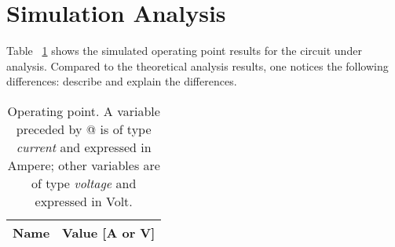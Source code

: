 \section{Simulation Analysis}
\label{sec:simulation}


Table ~\ref{tab:op} shows the simulated operating point results for the circuit
under analysis. Compared to the theoretical analysis results, one notices the
following differences: describe and explain the differences.



\begin{table}[h]
	\centering
	\begin{tabular}{|l|r|}
		\hline    
		{\bf Name} & {\bf Value [A or V]} \\ \hline
    		
	\end{tabular}
	
	\caption{Operating point. A variable preceded by @ is of type {\em current}
	and expressed in Ampere; other variables are of type {\it voltage} and
	expressed in Volt.}
    
\label{tab:op}
\end{table}


